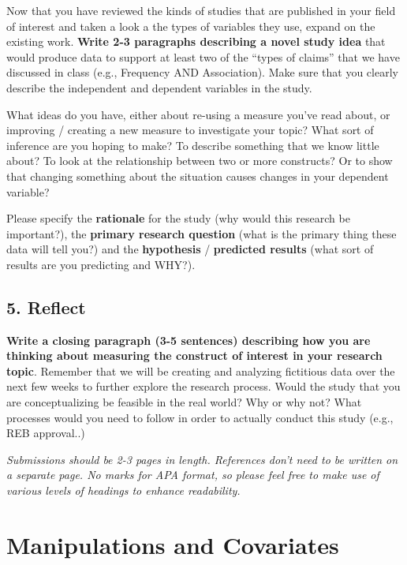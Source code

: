 \documentclass[
]{book}
\begin{document}
Now that you have reviewed the kinds of studies that are published in your field of interest and taken a look a the types of variables they use, expand on the existing work. \textbf{Write 2-3 paragraphs describing a novel study idea} that would produce data to support at least two of the ``types of claims'' that we have discussed in class (e.g., Frequency AND Association). Make sure that you clearly describe the independent and dependent variables in the study.

What ideas do you have, either about re-using a measure you've read about, or improving / creating a new measure to investigate your topic? What sort of inference are you hoping to make? To describe something that we know little about? To look at the relationship between two or more constructs? Or to show that changing something about the situation causes changes in your dependent variable?

Please specify the \textbf{rationale} for the study (why would this research be important?), the \textbf{primary research question} (what is the primary thing these data will tell you?) and the \textbf{hypothesis} / \textbf{predicted results} (what sort of results are you predicting and WHY?).

\section*{5. Reflect}\label{reflect-1}

\textbf{Write a closing paragraph (3-5 sentences) describing how you are thinking about measuring the construct of interest in your research topic}. Remember that we will be creating and analyzing fictitious data over the next few weeks to further explore the research process. Would the study that you are conceptualizing be feasible in the real world? Why or why not? What processes would you need to follow in order to actually conduct this study (e.g., REB approval..)

\emph{Submissions should be 2-3 pages in length. References don't need to be written on a separate page. No marks for APA format, so please feel free to make use of various levels of headings to enhance readability.}

\chapter{Manipulations and Covariates}\label{manipulations-and-covariates}
\end{document}
